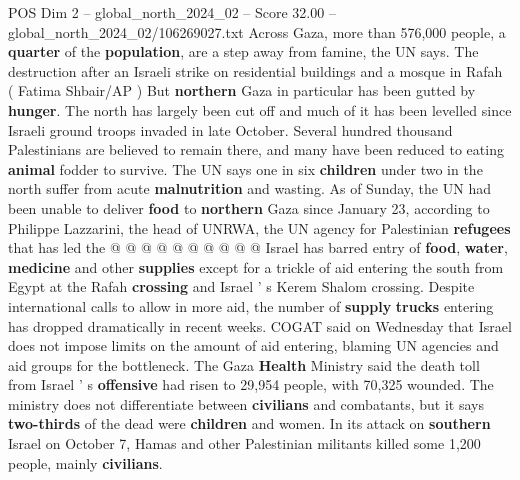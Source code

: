 \begin{textsample}{POS Dim 2 – global\_north\_2024\_02 – Score 32.00 – global\_north\_2024\_02/106269027.txt}
Across Gaza, more than 576,000 people, a \textbf{quarter} of the \textbf{population}, are a step away from famine, the UN says.
The destruction after an Israeli strike on residential buildings and a mosque in Rafah ( Fatima Shbair/AP ) But \textbf{northern} Gaza in particular has been gutted by \textbf{hunger}.
The north has largely been cut off and much of it has been levelled since Israeli ground troops invaded in late October.
Several hundred thousand Palestinians are believed to remain there, and many have been reduced to eating \textbf{animal} fodder to survive.
The UN says one in six \textbf{children} under two in the north suffer from acute \textbf{malnutrition} and wasting.
As of Sunday, the UN had been unable to deliver \textbf{food} to \textbf{northern} Gaza since January 23, according to Philippe Lazzarini, the head of UNRWA, the UN agency for Palestinian \textbf{refugees} that has led the @ @ @ @ @ @ @ @ @ @ Israel has barred entry of \textbf{food}, \textbf{water}, \textbf{medicine} and other \textbf{supplies} except for a trickle of aid entering the south from Egypt at the Rafah \textbf{crossing} and Israel ' s Kerem Shalom crossing.
Despite international calls to allow in more aid, the number of \textbf{supply} \textbf{trucks} entering has dropped dramatically in recent weeks.
COGAT said on Wednesday that Israel does not impose limits on the amount of aid entering, blaming UN agencies and aid groups for the bottleneck.
The Gaza \textbf{Health} Ministry said the death toll from Israel ' s \textbf{offensive} had risen to 29,954 people, with 70,325 wounded.
The ministry does not differentiate between \textbf{civilians} and combatants, but it says \textbf{two-thirds} of the dead were \textbf{children} and women.
In its attack on \textbf{southern} Israel on October 7, Hamas and other Palestinian militants killed some 1,200 people, mainly \textbf{civilians}.

\end{textsample}
